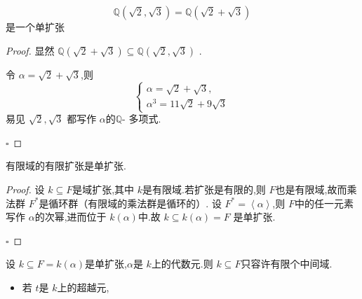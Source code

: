 \documentclass[lang=cn,12pt,color=green,fontset=none,pad]{elegantbook}
\begin{document}
\begin{example}
    \[
    \mathbb{Q} \left( \sqrt{2},\sqrt{3} \right)=\mathbb{Q} \left( \sqrt{2}+ \sqrt{3} \right)  
    \]是一个单扩张
\end{example}

\begin{proof}
    显然 \(  \mathbb{Q} \left( \sqrt{2}+ \sqrt{3} \right)  \subseteq \mathbb{Q} \left( \sqrt{2},\sqrt{3} \right)  \) .

    令 \(  \alpha=\sqrt{2}+ \sqrt{3}  \),则 \[
    \begin{cases} \alpha=\sqrt{2}+ \sqrt{3},\\ 
    \alpha^{3} = 11\sqrt{2}+  9\sqrt{3}  \end{cases} 
    \] 易见 \(  \sqrt{2},\sqrt{3}  \) 都写作 \(  \alpha  \)的\(  \mathbb{Q}   \)- 多项式. 

    \hfill $\square$
\end{proof}

\begin{proposition}\label{pro:f-f-s}
    有限域的有限扩张是单扩张.
\end{proposition}
\begin{proof}
    设 \(  k\subseteq F  \)是域扩张,其中 \(  k  \)是有限域.若扩张是有限的,则 \(  F   \)也是有限域,故而乘法群 \(  F^{*}  \)是循环群（有限域的乘法群是循环的）.
    设 \(  F^{*}=\left<\alpha \right>  \),则 \(  F  \)中的任一元素写作 \(  \alpha  \)的次幂,进而位于 \(  k\left(  \alpha  \right)   \)中.故 \(  k\subseteq k\left(  \alpha  \right)=F   \)   是单扩张.

    \hfill $\square$
\end{proof}

\begin{proposition}
    设 \(  k\subseteq F  =k\left( \alpha \right) \)是单扩张,\(  \alpha  \)是 \(  k  \)上的代数元.则 \(  k\subseteq F  \)只容许有限个中间域.    
\end{proposition}

\begin{remark}
    \begin{itemize}
        \item 若 \(  t  \)是 \(  k  \)上的超越元,  
    \end{itemize}
    
\end{remark}
\end{document}
